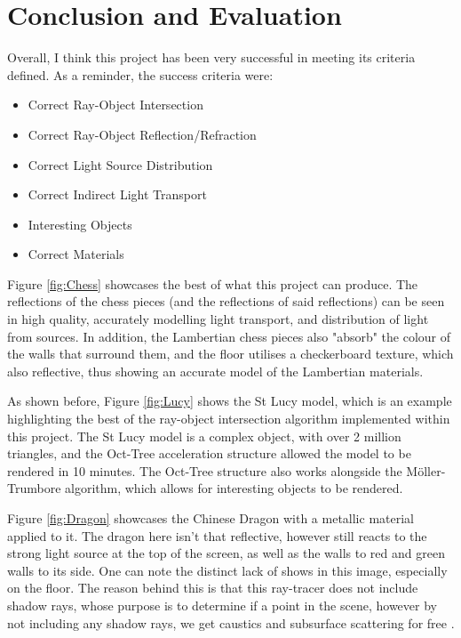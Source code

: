 \documentclass[../main.tex]{subfiles}
\begin{document}
\section{Conclusion and Evaluation}
Overall, I think this project has been very successful in meeting its criteria defined.
As a reminder, the success criteria were:
\begin{itemize}
  \item Correct Ray-Object Intersection
  \item Correct Ray-Object Reflection/Refraction
  \item Correct Light Source Distribution
  \item Correct Indirect Light Transport
  \item Interesting Objects
  \item Correct Materials
\end{itemize}

Figure \ref{fig:Chess} showcases the best of what this project can produce. The  
reflections of the chess pieces (and the reflections of said reflections) can be seen 
in high quality, accurately modelling light transport, and distribution of light from sources.
In addition, the Lambertian chess pieces also "absorb" the colour of the
walls that surround them, and the floor utilises a checkerboard texture, which also reflective, thus 
showing an accurate model of the Lambertian materials.

As shown before, Figure \ref{fig:Lucy} shows the St Lucy model, which is 
an example highlighting the best of the ray-object intersection algorithm implemented within this project.
The St Lucy model is a complex object, with over 2 million triangles, and the Oct-Tree acceleration structure
allowed the model to be rendered in 10 minutes. The Oct-Tree structure also works alongside the
M\"{o}ller-Trumbore algorithm, which allows for interesting objects to be rendered.

Figure \ref{fig:Dragon} showcases the Chinese Dragon with a metallic material applied to it.
The dragon here isn't that reflective, however still reacts to the strong light source at
the top of the screen, as well as the walls to red and green walls to its side. One can note 
the distinct lack of shows in this image, especially on the floor. The reason behind this is that
this ray-tracer does not include shadow rays, whose purpose is to determine if a point in the scene,
however by not including any shadow rays, we get caustics and subsurface scattering for free \cite{peter_shirley_trevor_david_black_steve_hollasch_ray_nodate}.
\end{document}

